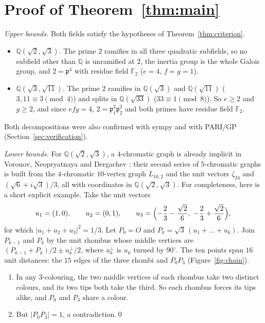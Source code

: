 \documentclass[11pt,a4paper]{amsart}
\theoremstyle{remark}
\newcommand{\F}{\mathbb{F}}
\newcommand{\Q}{\mathbb{Q}}
\newcommand{\p}{\mathfrak{p}}
\begin{document}
\section{Proof of Theorem~\ref{thm:main}}

\emph{Upper bounds.} Both fields satisfy the hypotheses of Theorem~\ref{thm:criterion}.
\begin{itemize}
\item $\Q(\sqrt2,\sqrt3)$. The prime $2$ ramifies in all three quadratic subfields, so no subfield other than
$\Q$ is unramified at $2$, the inertia group is the whole Galois group, and $2=\p^4$ with residue field $\F_2$
($e=4$, $f=g=1$).
\item $\Q(\sqrt3,\sqrt{11})$. The prime $2$ ramifies in $\Q(\sqrt3)$ and $\Q(\sqrt{11})$ ($3,11\equiv3\pmod 4$)
and splits in $\Q(\sqrt{33})$ ($33\equiv1\pmod 8$). So $e\ge2$ and $g\ge2$, and since $efg=4$,
$2=\p_1^2\p_2^2$ and both primes have residue field $\F_2$.
\end{itemize}
Both decompositions were also confirmed with sympy and with PARI/GP (Section~\ref{sec:verification}).

\emph{Lower bounds.} For $\Q(\sqrt2,\sqrt3)$, a $4$-chromatic graph is already implicit in Voronov, Neopryatnaya
and Dergachev \cite{VND}: their second series of $5$-chromatic graphs is built from the $4$-chromatic $10$-vertex
graph $L_{10,2}$ and the unit vectors $\zeta_{24}$ and $(\sqrt6+i\sqrt3)/3$, all with coordinates in
$\Q(\sqrt2,\sqrt3)$. For completeness, here is a short explicit example. Take the unit vectors
\[
u_1=(1,0),\qquad u_2=(0,1),\qquad u_3=\Bigl(-\frac23-\frac{\sqrt2}6,\ -\frac23+\frac{\sqrt2}6\Bigr),
\]
for which $|u_1+u_2+u_3|^2=1/3$. Let $P_0=O$ and $P_k=\sqrt3\,(u_1+\dots+u_k)$. Join $P_{k-1}$ and $P_k$ by the
unit rhombus whose middle vertices are $(P_{k-1}+P_k)/2\pm u_k^\perp/2$, where $u_k^\perp$ is $u_k$ turned by
$90^\circ$. The ten points span $16$ unit distances: the $15$ edges of the three rhombi and $P_0P_3$
(Figure~\ref{fig:chain}).
\begin{enumerate}
\item In any $3$-colouring, the two middle vertices of each rhombus take two distinct colours, and its two tips
both take the third. So each rhombus forces its tips alike, and $P_0$ and $P_3$ share a colour.
\item But $|P_0P_3|=1$, a contradiction.\qed
\end{enumerate}
\end{document}
